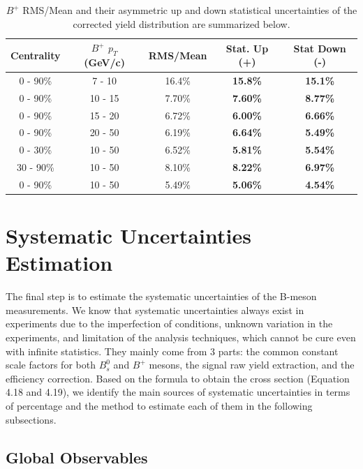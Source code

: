 \begin{table}[h]
\begin{center}
\caption{$B^+$ RMS/Mean and their asymmetric up and down statistical uncertainties of the corrected yield distribution are summarized below.}
\vspace{1em}
\label{BPStatErr}
  \begin{tabular}{| c | c |c | c| c|}
    \hline
     Centrality & $B^+$ $p_T$ (GeV/c) & RMS/Mean  & Stat. Up (+) & Stat Down (-)  \\
    \hline
    \hline
0 - 90\% & 7 - 10 &  16.4\%  &  \textbf{15.8\%}  & \textbf{15.1\%}   \\ 
0 - 90\% & 10 - 15 &  7.70\%   &  \textbf{7.60\%}  & \textbf{8.77\%}   \\ 
0 - 90\% & 15 - 20 &   6.72\%   &  \textbf{6.00\%}  & \textbf{6.66\%}   \\ 
0 - 90\% & 20 - 50 &  6.19\%    &  \textbf{6.64\%}  & \textbf{5.49\%}   \\ 
0 - 30\% & 10 - 50 &   6.52\% &  \textbf{5.81\%}  & \textbf{5.54\%}   \\ 
30 - 90\% & 10 - 50 & 8.10\%  &  \textbf{8.22\%}  & \textbf{6.97\%}   \\ 
0 - 90\% & 10 - 50 & 5.49\%  &  \textbf{5.06\%}  & \textbf{4.54\%}    \\ 
    \hline
    \hline
\end{tabular}
\end{center}
\end{table}


\section{Systematic Uncertainties Estimation} 

The final step is to estimate the systematic uncertainties of the B-meson measurements. We know that systematic uncertainties always exist in experiments due to the imperfection of conditions, unknown variation in the experiments, and limitation of the analysis techniques, which cannot be cure even with infinite statistics. They mainly come from 3 parts: the common constant scale factors for both $B^0_s$ and $B^{+}$ mesons, the signal raw yield extraction, and the efficiency correction. Based on the formula to obtain the cross section (Equation 4.18 and 4.19), we identify the main sources of systematic uncertainties in terms of percentage and the method to estimate each of them in the following subsections.  

\subsection{Global Observables}

